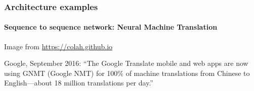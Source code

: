 \documentclass[9pt]{beamer}
\begin{document}




\begin{frame}
  \frametitle{Architecture examples}

  \framesubtitle{Sequence to sequence network: Neural Machine Translation}

  \begin{center}
  \end{center}

  {\small Image from \url{https://colah.github.io}}

  \bigskip

  Google, September 2016: ``The Google Translate mobile and web apps
  are now using GNMT (Google NMT) for 100\% of machine translations
  from Chinese to English—about 18 million translations per day.''

\end{frame}



\end{document}
